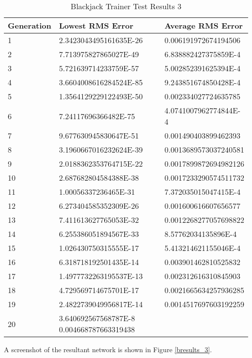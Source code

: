 \begin{center}
    \begin{longtable}{ | l | l | l |}
      \caption{Blackjack Trainer Test Results 3} \label{btr3} \\
   \hline
  Generation & Lowest RMS Error & Average RMS Error \\ \hline
1 &	2.3423043495161635E-26 &	0.006191972674194506 \\ \hline
2 &	7.713975827865027E-49 &	6.838882427375859E-4 \\ \hline
3 &	5.721639714233759E-57 &	5.002852391625394E-4 \\ \hline
4 &	3.6604008616284524E-85 &	9.243851674850428E-4 \\ \hline
5 &	1.3564129229122493E-50 &	0.002334027724635785 \\ \hline
6 &	7.24117696366482E-75 &	4.0741007962774844E-4 \\ \hline
7 &	9.677630945830647E-51 &	0.001490403899462393 \\ \hline
8 &	3.1960667016232624E-39 &	0.0013689573037240581 \\ \hline
9 &	2.0188362353764715E-22 &	0.0017899872694982126 \\ \hline
10 &	2.687682804584388E-38 &	0.0017233290574511732 \\ \hline
11 &	1.00056337236465E-31 &	7.372035015047415E-4 \\ \hline
12 &	6.273404585352309E-26 &	0.001600616607656577 \\ \hline
13 &	7.411613627765053E-32 &	0.0012268277057698822 \\ \hline
14 &	6.255386051894567E-33 &	8.57762034135896E-4 \\ \hline
15 &	1.026430750315555E-17 &	5.413214621155046E-4 \\ \hline
16 &	6.318718192501435E-14 &	0.003901462810525832 \\ \hline
17 &	1.4977732263195537E-13 &	0.002312616310845903 \\ \hline
18 &	4.729569714675701E-17 &	0.0021665634257936285 \\ \hline
19 &	2.4822739049956817E-14 &	0.0014517697603192259 \\ \hline
20 &	3.640692567568787E-8	0.004668787663319438 \\ \hline
\end{longtable}
\end{center}

A screenshot of the resultant network is shown in Figure \ref{bresults_3}.

